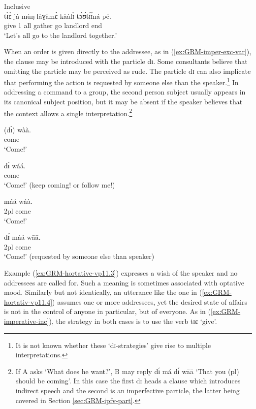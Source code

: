 \ex\label{ex:GRM-imperative-inc}{\rm Inclusive}\\
\gll tɪ̀ɛ̀ jà mùŋ làɣàmɛ̀ kààlɪ̀ tɔ́ʊ́tɪ́ɪ́ná  pé.\\
give {1\pl} all gather go landlord end\\
\glt `Let's all go to the landlord  together.'

\z
\z

When an order is given directly to the addressee, as in 
(\ref{ex:GRM-imper-exc-var}), the clause may be introduced with the particle 
{\sls dɪ}. Some consultants believe that omitting the particle may be perceived 
as rude.  The particle {\sls dɪ} can also implicate that performing 
the action is requested by someone else than the speaker.\footnote{It is not 
known whether these `{\sls dɪ}-strategies' give rise to multiple 
interpretations.}  In addressing a command to a group, the second person  
subject   usually appears in its canonical subject position, but it may 
be absent if the speaker believes that the context allows a single 
interpretation.\footnote{If A asks `What does he want?', B may reply {\sls dɪ́  
má dɪ́ wāā} `That you ({\sc pl}) should be coming'. In this case the first 
{\sls dɪ} heads a  clause which introduces indirect speech and the second is an 
imperfective particle,  the latter being covered in Section 
\ref{sec:GRM-ipfv-part}. }


\begin{multicols}{2}
 

\ea\label{ex:GRM-imper-exc-var}
\ea\label{ex:GRM-imper-exc-var-sg}
\gll (dɪ̀)  wàà.\\
 {\comp} come\\
\glt `Come!'

\ex 
\gll dɪ̀ wáá.\\
 {\comp} come\\
 \glt `Come!' (keep coming! or follow me!)
 
\ex 
\gll máá wáà.\\
 {\sc 2pl} come\\
\glt `Come!'

\ex\label{ex:GRM-imper-exc-var-out}  
\gll dɪ́ máá wāā.\\
 {\comp}  {\sc 2pl}  come\\
\glt `Come!' (requested by someone else than speaker)
\z
\z

\end{multicols}

Example (\ref{ex:GRM-hortative-vp11.3}) expresses a wish of the speaker and no addressees are called for. Such a meaning is sometimes associated with  optative mood. Similarly but not  identically,  an utterance like the one in (\ref{ex:GRM-hortativ-vp11.4})  assumes one or more addressees, yet the desired state of affairs is not in the control of anyone in particular, but of everyone. As in (\ref{ex:GRM-imperative-inc}), the  strategy in both cases is to use the verb {\sls tɪɛ} `give'.  

